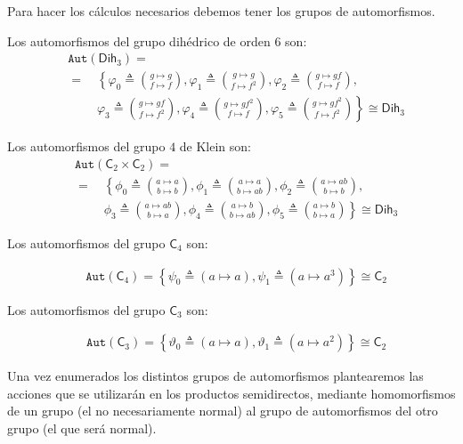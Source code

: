 \documentclass[12pt,a4paper,fleqn,spanish,final,openright]{extbook}
\theoremstyle{definition}
\theoremstyle{remark}
\begin{document}
Para hacer los cálculos necesarios debemos tener los grupos de automorfismos. 

Los automorfismos del grupo dihédrico de orden $6$ son:
\begin{align}
&\texttt{Aut}(\mathsf{Dih}_{3})=\nonumber\\ 
&=\quad
    \left\lbrace \right.
        \varphi_0\triangleq\binom{g\mapsto g}{f\mapsto f}, 
        \varphi_1\triangleq\binom{g\mapsto g}{f\mapsto f^2}, 
        \varphi_2\triangleq\binom{g\mapsto gf}{f\mapsto f},\nonumber\\
&\phantom{=}\quad\varphi_3\triangleq\binom{g\mapsto gf}{f\mapsto f^2}, 			
	\varphi_4\triangleq\binom{g\mapsto gf^2}{f
	\mapsto f}, \varphi_5\triangleq\binom{g\mapsto gf^2}{f\mapsto f^2}
    \left. \right\rbrace\nonumber \cong \mathsf{Dih}_{3}
\end{align}

Los automorfismos del grupo $4$ de Klein son:
\begin{align}
&\texttt{Aut}(\mathsf{C}_{2}\times\mathsf{C}_{2})=\nonumber\\ 
&=\quad
	\left\lbrace \right.
	\phi_0\triangleq\binom{a\mapsto a}{b\mapsto b}, 
	\phi_1\triangleq\binom{a\mapsto a}{b\mapsto ab}, 
	\phi_2\triangleq\binom{a\mapsto ab}{b\mapsto b},\nonumber\\
&\phantom{=}\quad
	\phi_3\triangleq\binom{a\mapsto ab}{b\mapsto a}, 			
	\phi_4\triangleq\binom{a\mapsto b}{b\mapsto ab}, 
	\phi_5\triangleq\binom{a\mapsto b}{b\mapsto a}
	\left. \right\rbrace\nonumber \cong \mathsf{Dih}_{3}
\end{align}

Los automorfismos del grupo $\mathsf{C}_{4}$ son:

\begin{align}
&\texttt{Aut}(\mathsf{C}_{4})=
	\left\lbrace
		\psi_0\triangleq\left({a\mapsto a}\right), 
		\psi_1\triangleq\left({a\mapsto a^3}\right)
	\right\rbrace 
	\cong \mathsf{C}_{2}
\end{align}

Los automorfismos del grupo $\mathsf{C}_{3}$ son:

\begin{align}
&\texttt{Aut}(\mathsf{C}_{3})=
\left\lbrace
	\vartheta_0\triangleq\left({a\mapsto a}\right), 
	\vartheta_1\triangleq\left({a\mapsto a^2}\right)
\right\rbrace 
\cong \mathsf{C}_{2}
\end{align}

Una vez enumerados los distintos grupos de automorfismos plantearemos las acciones 
que se utilizarán en los productos semidirectos, mediante homomorfismos de un grupo 
(el no necesariamente normal) al grupo de automorfismos del otro grupo 
(el que será normal).
\end{document}
